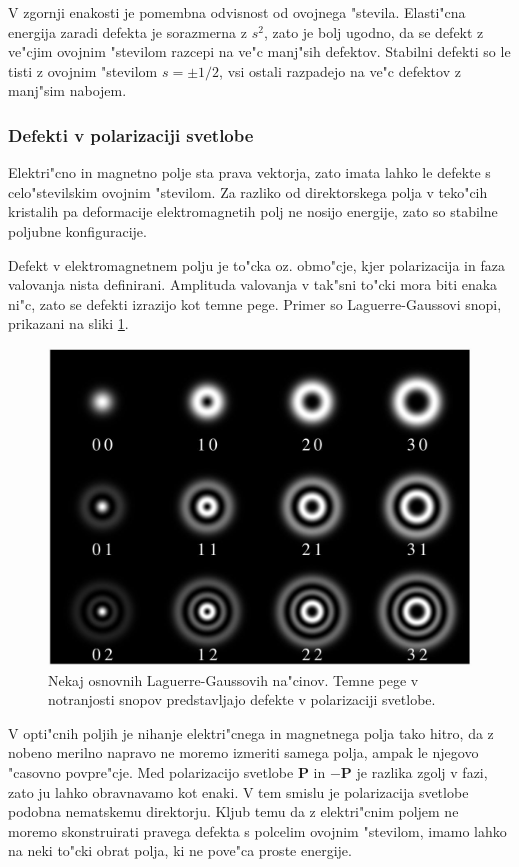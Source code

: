 \documentclass[a4paper,10pt]{article}
\renewcommand{\vec}{\mathbf}
\begin{document}
V zgornji enakosti je pomembna odvisnost od ovojnega "stevila. 
Elasti"cna energija zaradi defekta je sorazmerna z $s^2$, zato je bolj ugodno, da se defekt z ve"cjim ovojnim "stevilom razcepi na ve"c manj"sih defektov. 
Stabilni defekti so le tisti z ovojnim "stevilom $s=\pm1/2$, vsi ostali razpadejo na ve"c defektov z manj"sim nabojem. 

\subsubsection{Defekti v polarizaciji svetlobe}
Elektri"cno in magnetno polje sta prava vektorja, zato imata lahko le defekte s celo"stevilskim ovojnim "stevilom. 
Za razliko od direktorskega polja v teko"cih kristalih pa deformacije elektromagnetih polj ne nosijo energije, zato so stabilne poljubne konfiguracije. 

Defekt v elektromagnetnem polju je to"cka oz. obmo"cje, kjer polarizacija in faza valovanja nista definirani. 
Amplituda valovanja v tak"sni to"cki mora biti enaka ni"c, zato se defekti izrazijo kot temne pege. 
Primer so Laguerre-Gaussovi snopi, prikazani na sliki \ref{fig:laguerre-gauss}. 

\begin{figure}[h]
 \centering
 \includegraphics[width=.6\textwidth]{./Slike/LG-wiki}
 \caption{Nekaj osnovnih Laguerre-Gaussovih na"cinov. Temne pege v notranjosti snopov predstavljajo defekte v polarizaciji svetlobe. \cite{lg-wiki}}
 \label{fig:laguerre-gauss}
\end{figure}


V opti"cnih poljih je nihanje elektri"cnega in magnetnega polja tako hitro, da z nobeno merilno napravo ne moremo izmeriti samega polja, ampak le njegovo "casovno povpre"cje. 
Med polarizacijo svetlobe $\vec P$ in $-\vec P$ je razlika zgolj v fazi, zato ju lahko obravnavamo kot enaki. 
V tem smislu je polarizacija svetlobe podobna nematskemu direktorju. 
Kljub temu da z elektri"cnim poljem ne moremo skonstruirati pravega defekta s polcelim ovojnim "stevilom, imamo lahko na neki to"cki obrat polja, ki ne pove"ca proste energije. 
\end{document}
